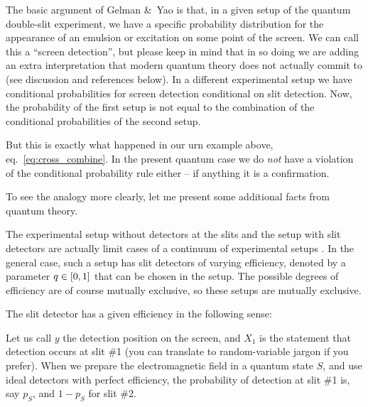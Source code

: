 \documentclass[\ifafour a4paper,12pt,\else a5paper,10pt,\fi%
onecolumn,oneside,article,%
british%
]{memoir}
\theoremstyle{remark}
\theoremstyle{innote}
\newcommand*{\citep}{\parencites}%
\newcommand*{\amp}{\&}
\DeclarePairedDelimiter\clcl{[}{]}
\renewcommand*{\|}[1][]{\nonscript\,#1\vert\nonscript\;\mathopen{}}
\newcommand*{\eqn}{eq.}%
\newcommand*{\yxa}{X_{1}}
\newcommand*{\yxb}{X_{2}}
\begin{document}
The basic argument of Gelman \amp\ Yao is that, in a given setup of the
quantum double-slit experiment, we have a specific probability distribution
for the appearance of an emulsion or excitation on some point of the
screen. We can call this a \enquote{screen detection}, but please keep in
mind that in so doing we are adding an extra interpretation that modern
quantum theory does not actually commit to (see discussion and references
below). In a different experimental setup we have conditional probabilities
for screen detection conditional on slit detection. Now, the probability of
the first setup is not equal to the combination of the conditional
probabilities of the second setup.

But this is exactly what happened in our urn example above,
\eqn~\eqref{eq:cross_combine}. In the present quantum case we do \emph{not}
have a violation of the conditional probability rule either -- if anything
it is a confirmation.

To see the analogy more clearly, let me present some additional facts from
quantum theory.

\medskip

The experimental setup without detectors at the slits and the setup with
slit detectors are actually limit cases of a continuum of experimental
setups \citep{woottersetal1979}[for a recent review and further references
see][]{banaszeketal2013}. In the general case, such a setup has slit
detectors of varying efficiency, denoted by a parameter $q \in \clcl{0, 1}$
that can be chosen in the setup. The possible degrees of efficiency are of
course mutually exclusive, so these setups are mutually exclusive.

The slit detector has a given efficiency in the following sense:

Let us call $y$ the detection position on the screen, and $\yxa$ is the
statement that detection occurs at slit \#1 (you can translate to
random-variable jargon if you prefer). When we prepare the electromagnetic
field in a quantum state $S$, and use ideal detectors with perfect
efficiency, the probability of detection at slit \#1 is, say $p_{S}$, and
$1-p_{S}$ for slit \#2.

\end{document}
